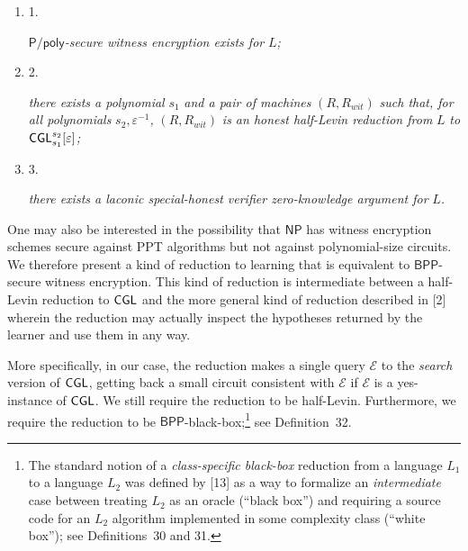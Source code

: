 \documentclass[10pt,a4paper]{article}
\begin{document}
\begin{enumerate}


\item[] 
1. 


${\mathsf{P}}/{\mathsf{poly}}$\emph{-secure witness encryption exists for }$L$\emph{;}\par





\item[] 
2. 


\emph{there exists a polynomial }$s_{1}$\emph{ and a pair of machines }$(R,R_{wit})$\emph{ such that, for all polynomials }$s_{2},\varepsilon^{-1}$\emph{, }$(R,R_{wit})$\emph{ is an honest half-Levin reduction from }$L$\emph{ to }${\sf CGL}^{s_{2}}_{s_{1}}[\varepsilon]$\emph{;}\par





\item[] 
3. 


\emph{there exists a laconic special-honest verifier zero-knowledge argument for }$L$\emph{.}\par





\end{enumerate}






One may also be interested in the possibility that ${\mathsf{NP}}$ has witness encryption schemes secure against PPT algorithms but not against polynomial-size circuits. We therefore present a kind of reduction to learning that is equivalent to ${\mathsf{BPP}}$-secure witness encryption. This kind of reduction is intermediate between a half-Levin reduction to ${\sf CGL}$ and the more general kind of reduction described in [2] wherein the reduction may actually inspect the hypotheses returned by the learner and use them in any way.\par




More specifically, in our case, the reduction makes a single query $\mathcal{E}$ to the \emph{search} version of ${\sf CGL}$, getting back a small circuit consistent with $\mathcal{E}$ if $\mathcal{E}$ is a yes-instance of ${\sf CGL}$. We still require the reduction to be half-Levin. Furthermore, we require the reduction to be ${\mathsf{BPP}}$-black-box;\footnote{The standard notion of a \emph{class-specific black-box} reduction from a language $L_{1}$ to a language $L_{2}$ was defined by [13] as a way to formalize an \emph{intermediate} case between treating $L_{2}$ as an oracle (“black box”) and requiring a source code for an $L_{2}$ algorithm implemented in some complexity class (“white box”); see Definitions 30 and 31.} see Definition 32.\par
\end{document}
